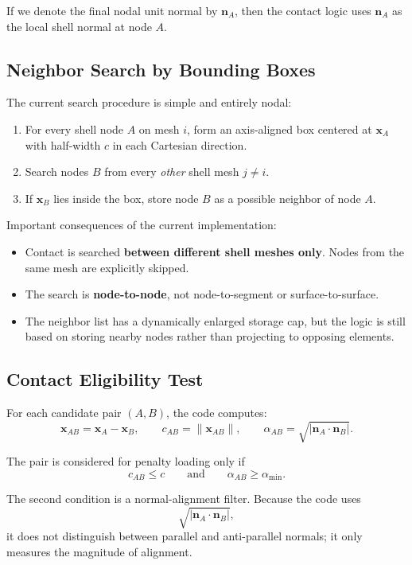 \documentclass[11pt]{article}
\begin{document}
If we denote the final nodal unit normal by $\bm{n}_A$, then the contact logic uses $\bm{n}_A$ as the local shell normal at node $A$.

\subsection{Neighbor Search by Bounding Boxes}

The current search procedure is simple and entirely nodal:
\begin{enumerate}[leftmargin=*]
\item For every shell node $A$ on mesh $i$, form an axis-aligned box centered at $\bm{x}_A$ with half-width $c$ in each Cartesian direction.
\item Search nodes $B$ from every \emph{other} shell mesh $j \ne i$.
\item If $\bm{x}_B$ lies inside the box, store node $B$ as a possible neighbor of node $A$.
\end{enumerate}

Important consequences of the current implementation:
\begin{itemize}[leftmargin=*]
\item Contact is searched \textbf{between different shell meshes only}. Nodes from the same mesh are explicitly skipped.
\item The search is \textbf{node-to-node}, not node-to-segment or surface-to-surface.
\item The neighbor list has a dynamically enlarged storage cap, but the logic is still based on storing nearby nodes rather than projecting to opposing elements.
\end{itemize}

\subsection{Contact Eligibility Test}

For each candidate pair $(A,B)$, the code computes:
\[
\bm{x}_{AB} = \bm{x}_A - \bm{x}_B,
\qquad
c_{AB} = \|\bm{x}_{AB}\|,
\qquad
\alpha_{AB} = \sqrt{\left| \bm{n}_A \cdot \bm{n}_B \right|}.
\]

The pair is considered for penalty loading only if
\[
c_{AB} \le c
\qquad \text{and} \qquad
\alpha_{AB} \ge \alpha_{\min}.
\]

The second condition is a normal-alignment filter. Because the code uses
\[
\sqrt{|\bm{n}_A \cdot \bm{n}_B|},
\]
it does not distinguish between parallel and anti-parallel normals; it only measures the magnitude of alignment.
\end{document}
